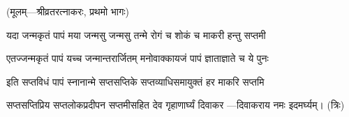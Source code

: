 
\centerline{\small{(मूलम्—श्रीव्रतरत्नाकरः, प्रथमो भागः)}}


\twolineshloka
{यदा जन्मकृतं पापं मया जन्मसु जन्मसु}
{तन्मे रोगं च शोकं च माकरी हन्तु सप्तमी}

\twolineshloka
{एतज्जन्मकृतं पापं यच्च जन्मान्तरार्जितम्}
{मनोवाक्कायजं पापं ज्ञाताज्ञाते च ये पुनः}

\twolineshloka
{इति सप्तविधं पापं स्नानान्मे सप्तसप्तिके}
{सप्तव्याधिसमायुक्तं हर माकरि सप्तमि}


\twolineshloka
{सप्तसप्तिप्रिय सप्तलोकप्रदीपन}
{सप्तमीसहित देव गृहाणार्घ्यं दिवाकर}
\nobreak\hfill{}—दिवाकराय नमः इदमर्घ्यम्। (त्रिः)

\closesection
